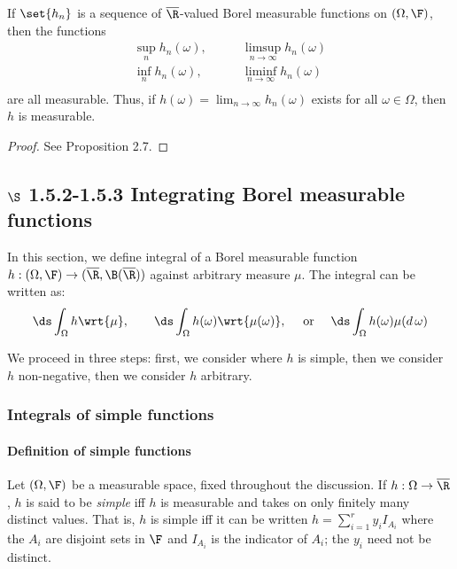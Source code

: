 \documentclass{article} %
\begin{document}
\begin{proposition}
If $\set{h_n}$ is a sequence of $\overline{\R}$-valued Borel measurable functions on $(\Omega, \F)$, then the functions
\begin{align*}
\sup_n h_n(\omega), & \quad \quad \limsup_{n \to \infty} h_n(\omega) \\
\inf_n h_n(\omega), & \quad \quad  \liminf_{n \to \infty} h_n(\omega) \\	
\end{align*}
are all measurable. Thus, if $h(\omega) = \lim_{n \to \infty} h_n(\omega)$ exists for all $\omega \in \Omega$, then $h$ is measurable.
\label{prop:borel_measurability_closed_under_inf_sup_liminf_limsup}
\end{proposition}

\begin{proof}
See \cite{folland1999real} Proposition 2.7.
\end{proof}

\subsection{$\S$ 1.5.2-1.5.3 Integrating  Borel measurable functions}

In this section, we define integral of a Borel measurable function $h : (\Omega, \F) \to (\overline{\R}, \B(\overline{\R}))$ against arbitrary measure $\mu$.  The integral can be written as:
\[ \ds\int_{\Omega} h \wrt{\mu}, \quad \quad \ds\int_{\Omega} h(\omega) \wrt{\mu(\omega)}, \quad \text{ or } \quad \ds\int_{\Omega} h(\omega) \mu(d \, \omega) \]
 
 We proceed in three steps: first, we consider where $h$ is simple, then we consider $h$ non-negative, then we consider $h$ arbitrary. 

\subsubsection{Integrals of simple functions}

\paragraph{Definition of simple functions} 

\begin{definition}
Let $(\Omega, \F)$ be a measurable space, fixed throughout the discussion.  If $h : \Omega \to \overline{\R}$, $h$ is said to be \textit{simple} iff $h$ is measurable and takes on only finitely many distinct values.  That is, $h$ is simple iff it can be written $h = \sum_{i=1}^r y_i I_{A_i}$ where the $A_i$ are disjoint sets in $\F$ and $I_{A_i}$ is the indicator of $A_i$; the $y_i$ need not be distinct. 
\label{def:simple_function}	
\end{definition}
\end{document}
